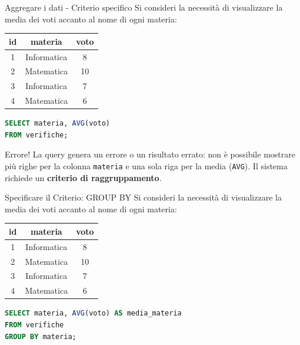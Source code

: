 \documentclass{beamer}
\begin{document}
\begin{frame}[fragile]{Aggregare i dati - Criterio specifico}
Si consideri la necessità di visualizzare la media dei voti accanto al nome di ogni materia:

\begin{center}
\begin{tabular}{|c|c|c|}
\hline
\textbf{id} & \textbf{materia} & \textbf{voto} \\ \hline
1 & Informatica & 8 \\ \hline
2 & Matematica  & 10 \\ \hline
3 & Informatica & 7 \\ \hline
4 & Matematica  & 6 \\ \hline
\end{tabular}
\end{center}

\medskip
\begin{lstlisting}[language=SQL]
SELECT materia, AVG(voto) 
FROM verifiche;
\end{lstlisting}

\begin{alertblock}{Errore!}
La query genera un errore o un risultato errato: non è possibile mostrare più righe per la colonna \texttt{materia} e una sola riga per la media (\texttt{AVG}). Il sistema richiede un \textbf{criterio di raggruppamento}.
\end{alertblock}
\end{frame}

\begin{frame}[fragile]{Specificare il Criterio: GROUP BY}
Si consideri la necessità di visualizzare la media dei voti accanto al nome di ogni materia:

\begin{center}
\begin{tabular}{|c|c|c|}
\hline
\textbf{id} & \textbf{materia} & \textbf{voto} \\ \hline
1 & Informatica & 8 \\ \hline
2 & Matematica  & 10 \\ \hline
3 & Informatica & 7 \\ \hline
4 & Matematica  & 6 \\ \hline
\end{tabular}
\end{center}

\begin{lstlisting}[language=SQL]
SELECT materia, AVG(voto) AS media_materia
FROM verifiche
GROUP BY materia;
\end{lstlisting}

\end{frame}
\end{document}
